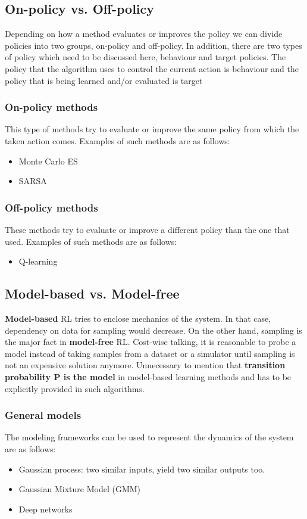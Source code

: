 \documentclass[a4paper,12pt]{article}
\begin{document}
\subsection{On-policy vs. Off-policy}
Depending on how a method evaluates or improves the policy we can divide policies into two groups, on-policy and off-policy. In addition, there are two types of policy which need to be discussed here, behaviour and target policies. The policy that the algorithm uses to control the current action is behaviour and the policy that is being learned and/or evaluated is target

\subsubsection{On-policy methods}
This type of methods try to evaluate or improve the same policy from which the taken action comes. Examples of such methods are as follows:
\begin{itemize}
    \item Monte Carlo ES
    \item SARSA
\end{itemize}

\subsubsection{Off-policy methods}
These methods try to evaluate or improve a different policy than the one that used. Examples of such methods are as follows:
\begin{itemize}
    \item Q-learning
\end{itemize}

\subsection{Model-based vs. Model-free}
\textbf{Model-based} RL tries to enclose mechanics of the system. In that case, dependency on data for sampling would decrease. On the other hand, sampling is the major fact in \textbf{model-free} RL. Cost-wise talking, it is reasonable to probe a model instead of taking samples from a dataset or a simulator until sampling is not an expensive solution anymore. Unnecessary to mention that \textbf{transition probability P is the model} in model-based learning methods and has to be explicitly provided in such algorithms.

\subsubsection{General models}
The modeling frameworks can be used to represent the dynamics of the system are as follows:
\begin{itemize}
    \item Gaussian process: two similar inputs, yield two similar outputs too.
    \item Gaussian Mixture Model (GMM)
    \item Deep networks
\end{itemize}
\end{document}
